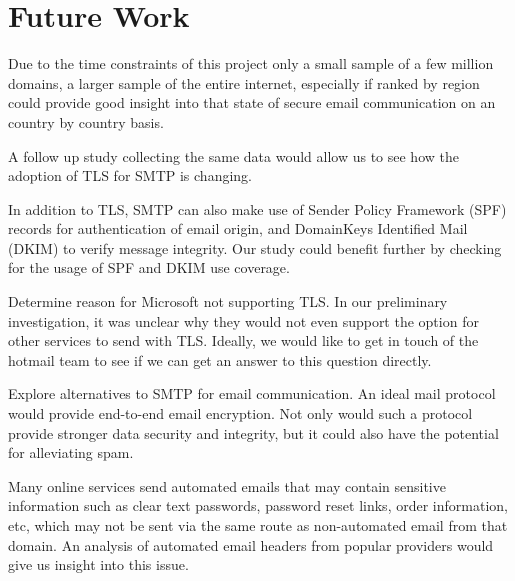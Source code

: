 \section{Future Work}
Due to the time constraints of this project only a small sample of a few million 
domains, a larger sample of the entire internet, especially if ranked by region 
could provide good insight into that state of secure email communication on an 
country by country basis.

A follow up study collecting the same data would allow us to see how the 
adoption of TLS for SMTP is changing.

In addition to TLS, SMTP can also make use of Sender Policy Framework (SPF) 
records for authentication of email origin, and DomainKeys Identified Mail 
(DKIM) to verify message integrity. Our study could benefit further by checking 
for the usage of SPF and DKIM use coverage.  

Determine reason for Microsoft not supporting TLS. In our preliminary 
investigation, it was unclear why they would not even support the option for 
other services to send with TLS. Ideally, we would like to get in touch of 
the hotmail team to see if we can get an answer to this question directly.

Explore alternatives to SMTP for email communication. An ideal mail protocol 
would provide end-to-end email encryption. Not only would such a protocol 
provide stronger data security and integrity, but it could also have the 
potential for alleviating spam. 

Many online services send automated emails that may contain sensitive 
information such as clear text passwords, password reset links, order 
information, etc, which may not be sent via the same route as non-automated 
email from that domain. An analysis of automated email headers from popular 
providers would give us insight into this issue.
